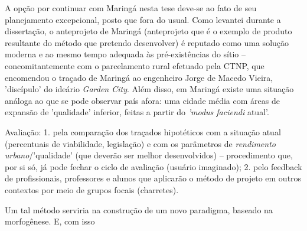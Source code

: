 \documentclass[]{report}
\begin{document}
    A opção por continuar com Maringá nesta tese deve-se ao fato de seu planejamento excepcional, posto que fora do usual. Como levantei durante a dissertação, o anteprojeto de Maringá (anteprojeto que é o exemplo de produto resultante do método que pretendo desenvolver) é reputado como uma solução moderna e ao mesmo tempo adequada às pré-existências do sítio – concomitantemente com o parcelamento rural efetuado pela CTNP, que encomendou o traçado de Maringá ao engenheiro Jorge de Macedo Vieira, 'discípulo' do ideário \textit{Garden City}. Além disso, em Maringá existe uma situação análoga ao que se pode observar país afora: uma cidade média com áreas de expansão de 'qualidade' inferior, feitas a partir do \textit{'modus faciendi} atual'.

    Avaliação: 1. pela comparação dos traçados hipotéticos com a situação atual (percentuais de viabilidade, legislação) e com os parâmetros de \textit{rendimento urbano}/'qualidade' (que deverão ser melhor desenvolvidos) – procedimento que, por si só, já pode fechar o ciclo de avaliação (usuário imaginado); 2. pelo feedback de profissionais, professores e alunos que aplicarão o método de projeto em outros contextos por meio de grupos focais (charretes). 



    Um tal método serviria na construção de um novo paradigma, baseado na morfogênese. E, com isso





    
    
    
    
\end{document}
